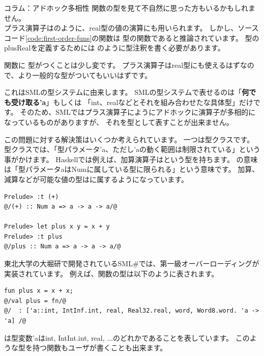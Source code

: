 \documentclass[11pt,a4paper]{jarticle}
\begin{document}
\begin{itembox}[l]{コラム：アドホック多相性}
関数の型を見て不自然に思った方もいるかもしれません。\\
プラス演算子はのように、real型の値の演算にも用いられます。
しかし、ソースコード\ref{code:first-order-funs}の関数は
型の関数であると推論されています。
型のplusRealを定義するためには
のように型注釈を書く必要があります。

関数に
型がつくことは少し変です。
プラス演算子はreal型にも使えるはずなので、より一般的な型がついてもいいはずです。

これはSMLの型システムに由来します。
SMLの型システムで表せるのは「\textbf{何でも受け取る'a}」もしくは
「int、realなどとそれを組み合わせたな具体型」だけです。
そのため、SMLではプラス演算子にようにアドホックに演算子が多相的になっているものがありますが、
それを型として表すことが出来ません。

この問題に対する解決策はいくつか考えられています。
一つは型クラスです。型クラスでは、「型パラメータ'a、ただし'aの動く範囲は制限されている」という事がかけます。
Haskellでは例えば、加算演算子はという型を持ちます。
の意味は「型パラメータaはNumに属している型に限られる」という意味です。
加算、減算などが可能な値の型はに属するようになっています。

\begin{lstlisting}[caption=Haskellでのplusの型付け]
Prelude> :t (+)
@/(+) :: Num a => a -> a -> a/@

Prelude> let plus x y = x + y
Prelude> :t plus
@/plus :: Num a => a -> a -> a/@
\end{lstlisting}

東北大学の大堀研で開発されているSML\#\cite{smlsharp}では、第一級オーバーローディングが実装されています。
例えば、関数の型は以下のように表されます。
\begin{lstlisting}[caption=SML\#でのplusの型付け]
fun plus x = x + x;
@/val plus = fn/@
@/  : ['a::int, IntInf.int, real, Real32.real, word, Word8.word. 'a -> 'a] /@
\end{lstlisting}
は型変数'aはint, IntInt.int, real, ...のどれかであることを表しています。
このような型を持つ関数もユーザが書くことも出来ます。

\end{itembox}
\end{document}
